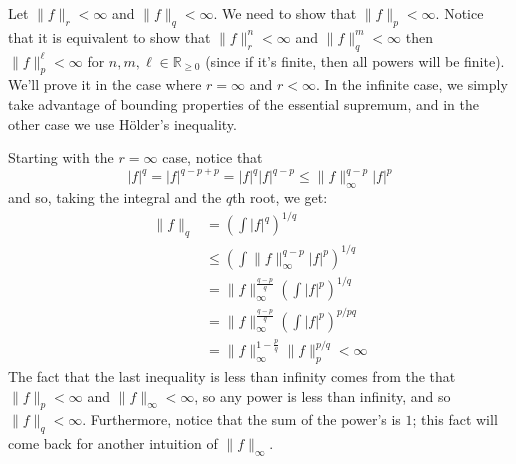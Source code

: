 \documentclass[oneside]{book}
\newcommand{\R}{\mathbb{R}}
\newcommand{\LRw}{\Leftrightarrow}
\begin{document}
\begin{Proof}
	Let $\|f\|_r < \infty$ and $\|f\|_q < \infty$. We need to show that $\|f\|_p < \infty$. Notice that it is equivalent
	to show that $\|f\|_r^n < \infty$ and $\|f\|_q^m < \infty$ then $\|f\|_p^\ell < \infty$ for $n,m,\ell \in \R_{\ge 0}$ (since
	if it's finite, then all powers will be finite). We'll prove it in the case where $r = \infty$ and $r < \infty$. In
	the infinite case, we simply take advantage of bounding properties of the essential supremum, and in the other case
	we use H\"older's inequality. 

	 Starting with the $r = \infty$ case,
	notice that
	\[
		|f|^q  = |f|^{q-p+p} = |f|^q|f|^{q-p} \le \|f\|_\infty^{q-p}|f|^p
	\]
	and so, taking the integral and the $q$th root, we get:
	\begin{align*}
		\|f\|_q &= \left(\int |f|^q\right)^{1/q}\\
				&\le \left(\int \|f\|_\infty^{q-p}|f|^p\right)^{1/q}\\
				&= \|f\|_\infty^{\frac{q-p}{q}}\left(\int |f|^p\right)^{1/q}\\
				&=  \|f\|_\infty^{\frac{q-p}{q}}\left(\int |f|^p\right)^{p/pq}\\
				&= \|f\|_\infty^{1-\frac{p}{q}} \|f\|_p^{p/q} < \infty
	\end{align*}
	The fact that the last inequality is less than infinity comes from the that $\|f\|_p < \infty$ and $\|f\|_\infty
	< \infty$, so any power is less than infinity, and so $\|f\|_q < \infty$. Furthermore, notice that the sum of the
	power's is $1$; this fact will come back for another intuition of $\|f\|_\infty$. 



\end{Proof}
\end{document}
